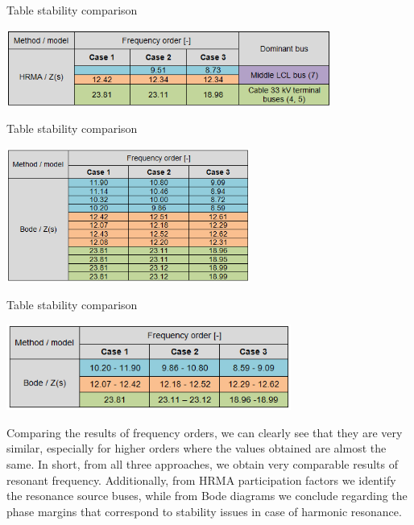 \documentclass[a4paper,11pt,twoside,openright]{report}
\begin{document}
\begin{table}[htb]
	\centering
	\caption{Table stability comparison}
	\includegraphics[width=0.8\textwidth]{img/Case123/stability_comparison_table_hrma.png}
  	\label{tab:stability_comparison_table_hrma}
\end{table}
\FloatBarrier

\begin{table}[htb]
	\centering
	\caption{Table stability comparison}
	\includegraphics[width=0.6\textwidth]{img/Case123/stability_comparison_table_bode1.png}
  	\label{tab:stability_comparison_table_bode1}
\end{table}
\FloatBarrier

\begin{table}[htb]
	\centering
	\caption{Table stability comparison}
	\includegraphics[width=0.7\textwidth]{img/Case123/stability_comparison_table_bode2.png}
  	\label{tab:stability_comparison_table_bode2}
\end{table}
\FloatBarrier

Comparing the results of frequency orders, we can clearly see that they are very similar, especially for higher orders where the values obtained are almost the same. In short, from all three approaches, we obtain very comparable results of resonant frequency. Additionally, from HRMA participation factors we identify the resonance source buses, while from Bode diagrams we conclude regarding the phase margins that correspond to stability issues in case of harmonic resonance.
\end{document}
